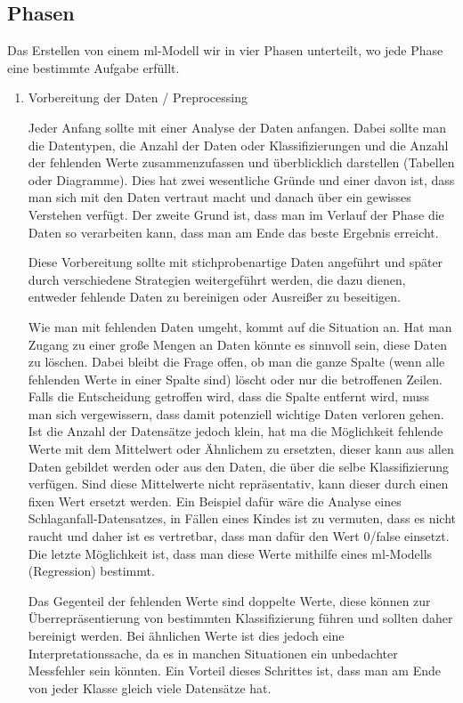 \subsection{Phasen}

Das Erstellen von einem \Gls{ml}-Modell wir in vier Phasen unterteilt, wo jede Phase eine bestimmte Aufgabe erfüllt.

\begin{enumerate}
    \item Vorbereitung der Daten / Preprocessing

          Jeder Anfang sollte mit einer Analyse der Daten anfangen. Dabei sollte man die Datentypen, die Anzahl der Daten oder Klassifizierungen und die Anzahl der fehlenden Werte zusammenzufassen und überblicklich darstellen (Tabellen oder Diagramme). Dies hat zwei wesentliche Gründe und einer davon ist, dass man sich mit den Daten vertraut macht und danach über ein gewisses Verstehen verfügt. Der zweite Grund ist, dass man im Verlauf der Phase die Daten so verarbeiten kann, dass man am Ende das beste Ergebnis erreicht.

          Diese Vorbereitung sollte mit stichprobenartige Daten angeführt und später durch verschiedene Strategien weitergeführt werden, die dazu dienen, entweder fehlende Daten zu bereinigen oder Ausreißer zu beseitigen.

          Wie man mit fehlenden Daten umgeht, kommt auf die Situation an.
          Hat man Zugang zu einer große Mengen an Daten könnte es sinnvoll sein, diese Daten zu löschen. Dabei bleibt die Frage offen, ob man die ganze Spalte (wenn alle fehlenden Werte in einer Spalte sind) löscht oder nur die betroffenen Zeilen. Falls die Entscheidung getroffen wird, dass die Spalte entfernt wird, muss man sich vergewissern, dass damit potenziell wichtige Daten verloren gehen. Ist die Anzahl der Datensätze jedoch klein, hat ma die Möglichkeit fehlende Werte mit dem Mittelwert oder Ähnlichem zu ersetzten, dieser kann aus allen Daten gebildet werden oder aus den Daten, die über die selbe Klassifizierung verfügen. Sind diese Mittelwerte nicht repräsentativ, kann dieser durch einen fixen Wert ersetzt werden. Ein Beispiel dafür wäre die Analyse eines Schlaganfall-Datensatzes, in Fällen eines Kindes ist zu vermuten, dass es nicht raucht und daher ist es vertretbar, dass man dafür den Wert 0/false einsetzt. Die letzte Möglichkeit ist, dass man diese Werte mithilfe eines \gls{ml}-Modells (Regression) bestimmt. \cite{MLkg}

          Das Gegenteil der fehlenden Werte sind doppelte Werte, diese können zur Überrepräsentierung von bestimmten Klassifizierung führen und sollten daher bereinigt werden. Bei ähnlichen Werte ist dies jedoch eine Interpretationssache, da es in manchen Situationen ein unbedachter Messfehler sein könnten. Ein Vorteil dieses Schrittes ist, dass man am Ende von jeder Klasse gleich viele Datensätze hat.


\end{enumerate}
